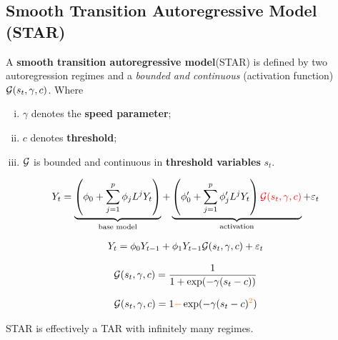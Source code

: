 \documentclass[11pt]{article}
\begin{document}
		\subsection{Smooth Transition Autoregressive Model (STAR)}
			\begin{definition}
				A \textbf{smooth transition autoregressive model}(STAR) is defined by two autoregression regimes and a \emph{bounded and continuous} (activation function) $\mathcal{{G}}(s_t, \gamma, c)$. Where 
				\begin{enumerate}[(i)]
					\item $\gamma$ denotes the \textbf{speed parameter};
					\item $c$ denotes \textbf{threshold};
					\item $\mathcal{{G}}$ is bounded and continuous in \textbf{threshold variables} $s_t$.
				\end{enumerate}
				\begin{gather}
					Y_t = \underbrace{\left(
						\phi_0 + \sum_{j=1}^p \phi_j L^j Y_t
					\right)}_{\text{base model}} + 
					\underbrace{\left(
						\phi_0' + \sum_{j=1}^p \phi_j' L^j Y_t
						\right)
						\textcolor{red}{\mathcal{{G}}(s_t, \gamma, c)}
					}_{\text{activation}}
					+ \varepsilon_t
				\end{gather}
			\end{definition}
			
			\begin{example}
				\begin{gather}
					Y_t = \phi_0 Y_{t-1} + \phi_1 Y_{t-1} \mathcal{{G}}(s_t, \gamma, c) + \varepsilon_t
				\end{gather}
			\end{example}
			
			\begin{example}
				\begin{gather}
					\mathcal{{G}}(s_t, \gamma, c) = \frac{1}{1 + \exp(-\gamma(s_t - c))}
				\end{gather}
			\end{example}
			
			\begin{example}
				\begin{gather}
					\mathcal{{G}}(s_t, \gamma, c) = 1 \textcolor{orange}{-} \exp(-\gamma (s_t - c)^{\textcolor{orange}{2}})
				\end{gather}
			\end{example}
			
			\begin{remark}
				STAR is effectively a TAR with infinitely many regimes.
			\end{remark}
		
\end{document}
